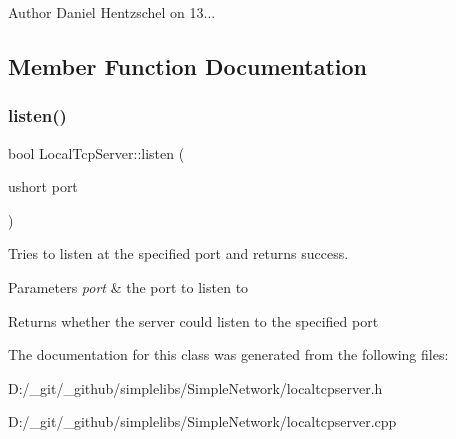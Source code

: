 \begin{DoxyAuthor}{Author}
Daniel Hentzschel on 13... 
\end{DoxyAuthor}


\subsection{Member Function Documentation}
\mbox{\label{class_local_tcp_server_a47116fc33d74d8b3a9b472af6ce8d32d}} 
\subsubsection{\texorpdfstring{listen()}{listen()}}
{\footnotesize\ttfamily bool Local\+Tcp\+Server\+::listen (\begin{DoxyParamCaption}\item[{ushort}]{port }\end{DoxyParamCaption})}



Tries to listen at the specified port and returns success. 


\begin{DoxyParams}{Parameters}
{\em port} & the port to listen to \\
\hline
\end{DoxyParams}
\begin{DoxyReturn}{Returns}
whether the server could listen to the specified port 
\end{DoxyReturn}


The documentation for this class was generated from the following files\+:\begin{DoxyCompactItemize}
\item 
D\+:/\+\_\+git/\+\_\+github/simplelibs/\+Simple\+Network/localtcpserver.\+h\item 
D\+:/\+\_\+git/\+\_\+github/simplelibs/\+Simple\+Network/localtcpserver.\+cpp\end{DoxyCompactItemize}
